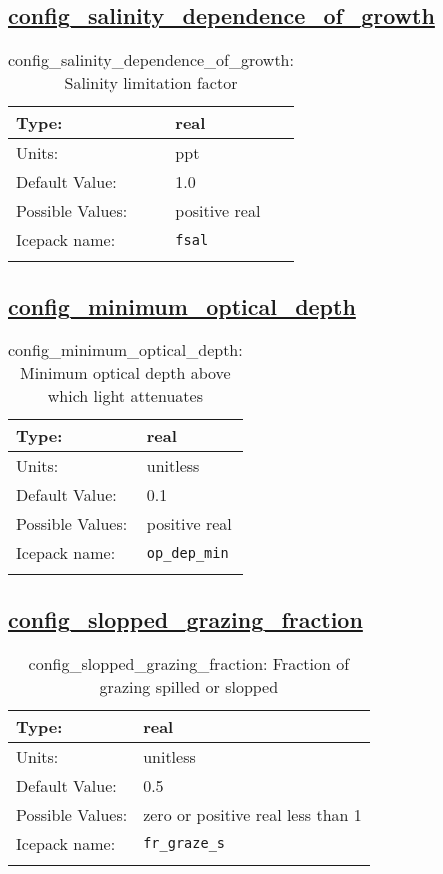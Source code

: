\subsection[config\_salinity\_dependence\_of\_growth]{\hyperref[sec:nm_tab_biogeochemistry]{config\_salinity\_dependence\_of\_growth}}
\label{subsec:nm_sec_config_salinity_dependence_of_growth}
\begin{center}
\begin{longtable}{| p{2.0in} || p{4.0in} |}
    \hline
    Type: & real \\
    \hline
    Units: & \si{ppt} \\
    \hline
    Default Value: & 1.0 \\
    \hline
    Possible Values: & positive real \\
    \hline
    \hline
    Icepack name: & \verb+fsal+ \\
    \caption{config\_salinity\_dependence\_of\_growth: Salinity limitation factor}
\end{longtable}
\end{center}
\subsection[config\_minimum\_optical\_depth]{\hyperref[sec:nm_tab_biogeochemistry]{config\_minimum\_optical\_depth}}
\label{subsec:nm_sec_config_minimum_optical_depth}
\begin{center}
\begin{longtable}{| p{2.0in} || p{4.0in} |}
    \hline
    Type: & real \\
    \hline
    Units: & \si{unitless} \\
    \hline
    Default Value: & 0.1 \\
    \hline
    Possible Values: & positive real \\
    \hline
    \hline
    Icepack name: & \verb+op_dep_min+ \\
    \caption{config\_minimum\_optical\_depth: Minimum optical depth above which light attenuates}
\end{longtable}
\end{center}
\subsection[config\_slopped\_grazing\_fraction]{\hyperref[sec:nm_tab_biogeochemistry]{config\_slopped\_grazing\_fraction}}
\label{subsec:nm_sec_config_slopped_grazing_fraction}
\begin{center}
\begin{longtable}{| p{2.0in} || p{4.0in} |}
    \hline
    Type: & real \\
    \hline
    Units: & \si{unitless} \\
    \hline
    Default Value: & 0.5 \\
    \hline
    Possible Values: & zero or positive real less than 1 \\
    \hline
    \hline
    Icepack name: & \verb+fr_graze_s+ \\
    \caption{config\_slopped\_grazing\_fraction: Fraction of grazing spilled or slopped}
\end{longtable}
\end{center}
